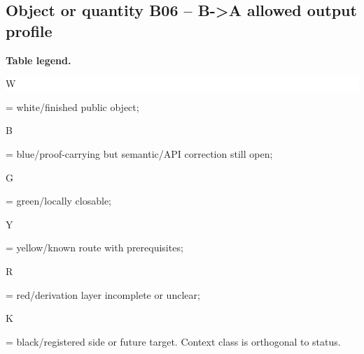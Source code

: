 \subsection*{Object or quantity B06 -- B->A allowed output profile}
\hypertarget{objproof:B06}{}
\par\smallskip\noindent\begin{minipage}{0.99\linewidth}\footnotesize\raggedright\textbf{Table legend.} \colorbox{white}{\strut W} = white/finished public object; \colorbox{cyan!20}{\strut B} = blue/proof-carrying but semantic/API correction still open; \colorbox{green!18}{\strut G} = green/locally closable; \colorbox{yellow!25}{\strut Y} = yellow/known route with prerequisites; \colorbox{red!20}{\strut R} = red/derivation layer incomplete or unclear; \colorbox{black!18}{\strut K} = black/registered side or future target. Context class is orthogonal to status.\end{minipage}\par\vspace{0.25em}
